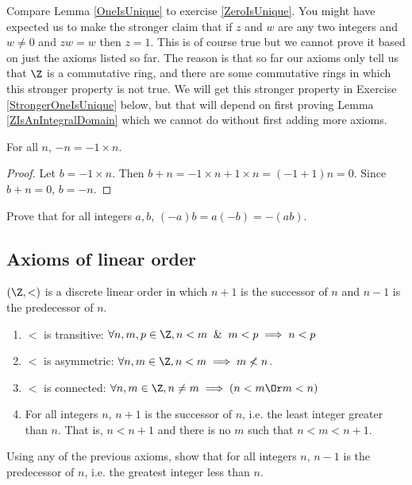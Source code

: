 \documentclass[oneside,12pt]{amsart}
\begin{document}
\begin{remark}
Compare Lemma \ref{OneIsUnique} to exercise \ref{ZeroIsUnique}. You might have expected
us to make the stronger claim that if $z$ and $w$ are any two integers and
$w\not=0$ and $zw = w$ then $z = 1$. This is of course true but we cannot prove
it based on just the axioms listed so far. The reason is that so far our axioms
only tell us that $\Z$ is a commutative ring, and there are some commutative rings
in which this stronger property is not true. We will get this stronger property
in Exercise \ref{StrongerOneIsUnique} below, but that will depend on first proving
Lemma \ref{ZIsAnIntegralDomain} which we cannot do without first adding more axioms.
\end{remark}

\begin{lemma}
For all $n$, $-n=-1\times n$.
\end{lemma}
\begin{proof}
Let $b=-1\times n$. Then $b+n = -1\times n + 1\times n = (-1 + 1)n = 0$.
Since $b+n=0$, $b=-n$.
\end{proof}

\begin{homework}
Prove that for all integers $a,b$, $(-a)b=a(-b)=-(ab)$.
\end{homework}

\subsection{Axioms of linear order}
$(\Z, <)$ is a discrete linear order in which $n+1$ is the successor of $n$ and
$n-1$ is the predecessor of $n$.

\begin{enumerate}
\item $<$ is transitive: $\forall n,m,p \in \Z, n < m \And m < p \implies n < p$
\item $<$ is asymmetric: $\forall n,m \in \Z, n < m \implies m \not< n$.
\item $<$ is connected: $\forall n,m \in \Z, n\not=m \implies (n < m \Or m < n)$
\item For all integers $n$, $n+1$ is the successor of $n$, i.e. the least integer greater than $n$.
That is, $n<n+1$ and there is no $m$ such that $n < m < n+1$.
\end{enumerate}

\begin{homework}
Using any of the previous axioms, show that for all integers
$n$, $n-1$ is the predecessor of $n$, i.e. the greatest integer
less than $n$.
\end{homework}
\end{document}
